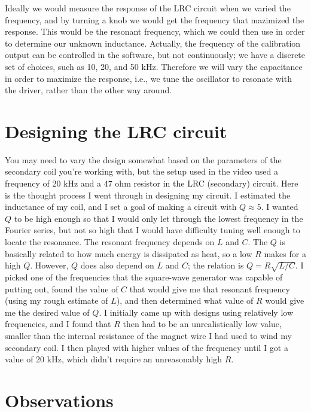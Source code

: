 Ideally we would measure the response of the LRC circuit when we
varied the frequency, and by turning a knob we would get the frequency
that mazimized the response. This would be the resonant frequency,
which we could then use in order to determine our unknown inductance.
Actually, the frequency of the calibration output can be controlled in
the software, but not continuously; we have a discrete set of choices,
such as 10, 20, and 50 kHz. Therefore we will vary the capacitance in
order to maximize the response, i.e., we tune the oscillator to resonate
with the driver, rather than the other way around.

\section*{Designing the LRC circuit}

You may need to vary the design somewhat based on the parameters of the secondary coil you're
working with, but the setup used in the video used  a frequency of 20 kHz
and a 47 ohm resistor in the LRC (secondary) circuit. Here is the thought
process I went through in designing my circuit. I estimated the inductance
of my coil, and I set a goal of making a circuit with $Q\approx 5$.
I wanted $Q$ to be high enough so that I
would only let through the lowest frequency in the Fourier series, but
not so high that I would have difficulty tuning well enough to locate the
resonance.  The resonant frequency depends on $L$ and $C$. The $Q$ is
basically related to how much energy is dissipated as heat, so a low
$R$ makes for a high $Q$. However, $Q$ does also depend on $L$ and $C$;
the relation is $Q=R\sqrt{L/C}$. I picked one of the frequencies that
the square-wave generator was capable of putting out, found the value of
$C$ that would give me that resonant frequency (using my rough estimate of $L$),
and then determined what value of $R$ would give me the desired value of
$Q$. I initially came up with designs using relatively low frequencies, and I found that $R$
then had to be an unrealistically low value, smaller than the internal
resistance of the magnet wire I had used to wind my secondary coil.
I then played with higher values of the frequency until I got a value of 20 kHz,
which didn't require an unreasonably high $R$.

\section*{Observations}


